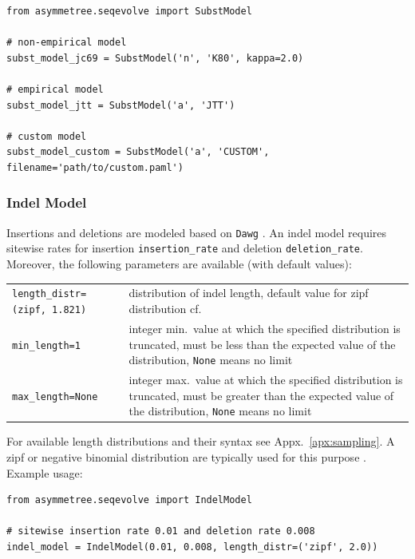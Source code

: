 \documentclass[hidelinks,11pt]{article}
\newcommand{\sq}{\textquotesingle}
\begin{document}
\begin{adjustwidth}{1cm}{1cm}\vspace{2mm}
\begin{verbatim}
from asymmetree.seqevolve import SubstModel

# non-empirical model
subst_model_jc69 = SubstModel('n', 'K80', kappa=2.0)

# empirical model
subst_model_jtt = SubstModel('a', 'JTT')

# custom model
subst_model_custom = SubstModel('a', 'CUSTOM', filename='path/to/custom.paml')
\end{verbatim}
\end{adjustwidth}


\subsubsection{Indel Model}

Insertions and deletions are modeled based on \texttt{Dawg} \citep{cartwright2005}.
An indel model requires sitewise rates for insertion \texttt{insertion\_rate} and deletion \texttt{deletion\_rate}.
Moreover, the following parameters are available (with default values):

\vspace{3mm}
{\small\centering
\begin{longtable}{ p{4.5cm} p{9cm} }
	\texttt{length\_distr=\newline (\sq zipf\sq, 1.821)} & distribution of indel
	length, default value for zipf distribution cf.\ \citep{chang2004}\\
	\texttt{min\_length=1} & integer min.\ value at which the specified distribution is truncated, must be less than the expected value of the distribution, \texttt{None} means no limit\\
	\texttt{max\_length=None} & integer max.\ value at which the specified distribution is truncated, must be greater than the expected value of the distribution, \texttt{None} means no limit\\
\end{longtable}
}
\vspace{3mm}

\noindent
For available length distributions and their syntax see
Appx.~\ref{apx:sampling}.
A zipf or negative binomial distribution are typically used for this purpose
\cite{cartwright2005,dalquen2012}.
Example usage:

\begin{adjustwidth}{1cm}{1cm}\vspace{2mm}
\begin{verbatim}
from asymmetree.seqevolve import IndelModel

# sitewise insertion rate 0.01 and deletion rate 0.008
indel_model = IndelModel(0.01, 0.008, length_distr=('zipf', 2.0))
\end{verbatim}
\end{adjustwidth}
\end{document}
